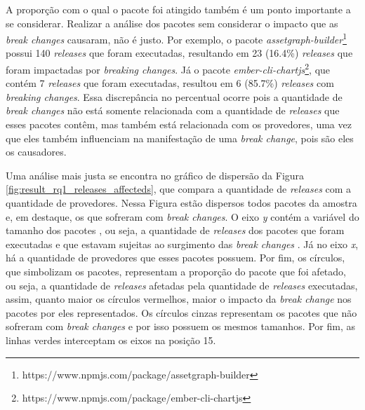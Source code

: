 A proporção com o qual o pacote foi atingido  também é um ponto importante a se considerar. Realizar a análise dos pacotes sem considerar o impacto que as \textit{break changes} causaram, não é justo. Por exemplo, o pacote \textit{assetgraph-builder}\footnote{https://www.npmjs.com/package/assetgraph-builder} possui 140 \textit{releases} que foram executadas, resultando em 23 (16.4\%) \textit{releases} que foram impactadas por \textit{breaking changes}. Já o pacote \textit{ember-cli-chartjs}\footnote{https://www.npmjs.com/package/ember-cli-chartjs}, que contém 7 \textit{releases} que foram executadas, resultou em 6 (85.7\%) \textit{releases} com \textit{breaking changes}. Essa discrepância no percentual ocorre pois a quantidade de \textit{break changes} não está somente relacionada com a quantidade de  \textit{releases} que esses pacotes contêm, mas também está relacionada com os provedores, uma vez que eles também influenciam na manifestação de uma \textit{break change}, pois são eles os causadores. 

Uma análise mais justa se encontra no gráfico de dispersão da Figura \ref{fig:result_rq1_releases_affecteds}, que compara a quantidade de \textit{releases} com a quantidade de provedores. Nessa Figura estão dispersos todos pacotes da amostra e, em destaque, os que sofreram com \textit{break changes}. O eixo \textit{y} contém a variável do tamanho dos pacotes , ou seja, a quantidade de \textit{releases} dos pacotes que foram executadas e que estavam sujeitas ao surgimento das \textit{break changes} . Já no eixo \textit{x}, há a quantidade de provedores que esses pacotes possuem. Por fim, os  círculos, que simbolizam os pacotes, representam a proporção do pacote que foi afetado, ou seja, a quantidade de \textit{releases} afetadas pela quantidade de \textit{releases} executadas, assim, quanto maior os círculos vermelhos, maior o impacto da \textit{break change} nos pacotes por eles representados.  Os círculos cinzas representam os pacotes que não sofreram com \textit{break changes} e por isso possuem os mesmos tamanhos. Por fim, as linhas verdes interceptam os eixos na posição 15.

